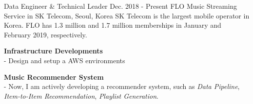 

\begin{cventries}
    \cventry
        {Data Engineer \& Technical Leader} %
        {Dec. 2018 - Present} %
        {FLO Music Streaming Service in SK Telecom, } %
        {Seoul, Korea}%
        { %
            SK Telecom is the largest mobile operator in Korea.
            FLO has 1.3 million and 1.7 million memberships in January and February 2019, respectively.
        }
        { %
            \begin{cvitems}
                \item {
                    {\bf Infrastructure Developments} \\
                    - Design and setup a AWS environments
                         \nn
                }
                \item {
                    {\bf Music Recommender System} \\
                    - Now, I am actively developing a recommender system, such as \textit{Data Pipeline}, \textit{Item-to-Item Recommendation}, \textit{Playlist Generation}. \nn
                }
            \end{cvitems}
        }
    \nn
    \nn


\end{cventries}
